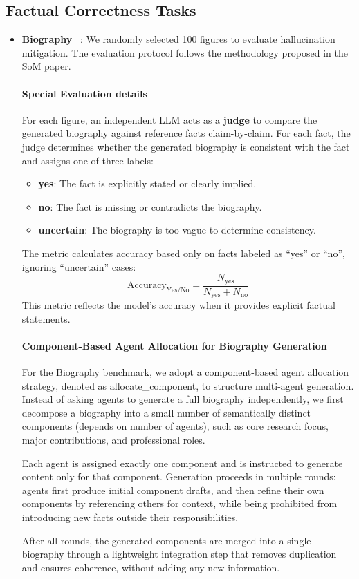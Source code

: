 \subsection{Factual Correctness Tasks}
\begin{itemize}
    \item \textbf{Biography}~ \cite{du2023improving}: We randomly selected 100 figures to evaluate hallucination mitigation. The evaluation protocol follows the methodology proposed in the SoM paper.
\paragraph{Special Evaluation details}
    For each figure, an independent LLM acts as a \textbf{judge} to compare the generated biography against reference facts claim-by-claim. For each fact, the judge determines whether the generated biography is consistent with the fact and assigns one of three labels:
    \begin{itemize}
        \item \textbf{yes}: The fact is explicitly stated or clearly implied.
        \item \textbf{no}: The fact is missing or contradicts the biography.
        \item \textbf{uncertain}: The biography is too vague to determine consistency.
    \end{itemize}

    The metric calculates accuracy based only on facts labeled as ``yes'' or ``no'', ignoring ``uncertain'' cases:
    \begin{equation}
        \text{Accuracy}_{\text{Yes/No}} = \frac{N_{\text{yes}}}{N_{\text{yes}} + N_{\text{no}}}
    \end{equation}
    This metric reflects the model's accuracy when it provides explicit factual statements.
\paragraph{Component-Based Agent Allocation for Biography Generation}

For the Biography benchmark, we adopt a component-based agent allocation strategy,
denoted as allocate\_component, to structure multi-agent generation.
Instead of asking agents to generate a full biography independently, we first decompose
a biography into a small number of semantically distinct components (depends on number of agents),
such as core research focus, major contributions, and professional roles.

Each agent is assigned exactly one component and is instructed to generate content
only for that component.
Generation proceeds in multiple rounds: agents first produce initial component drafts,
and then refine their own components by referencing others for context,
while being prohibited from introducing new facts outside their responsibilities.

After all rounds, the generated components are merged into a single biography through
a lightweight integration step that removes duplication and ensures coherence,
without adding any new information.
\end{itemize}
